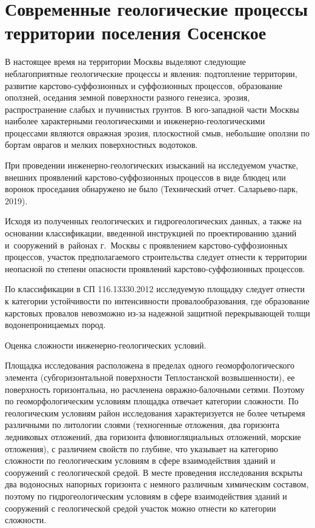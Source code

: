 \chapter{Современные геологические процессы территории поселения Сосенское}\label{ch:ch5}

В настоящее время на территории Москвы выделяют следующие неблагоприятные геологические процессы и явления: 
подтопление территории, развитие карстово-суффозионных и суффозионных процессов, образование оползней, 
оседания земной поверхности разного генезиса, эрозия, распространение слабых и пучинистых грунтов. 
В юго-западной части Москвы наиболее характерными геологическими и инженерно-геологическими процессами 
являются овражная эрозия, плоскостной смыв, небольшие оползни по бортам оврагов и мелких поверхностных водотоков.

При проведении инженерно-геологических изысканий на исследуемом участке, внешних проявлений карстово-суффозионных 
процессов в виде блюдец или воронок проседания обнаружено 
не было (Технический отчет. Саларьево-парк, 2019).

Исходя из полученных геологических и гидрогеологических данных, а также на основании классификации, 
введенной инструкцией по проектированию зданий и~сооружений в~районах г.~Москвы с проявлением 
карстово-суффозионных процессов, участок предполагаемого строительства следует отнести к территории 
неопасной по степени опасности проявлений карстово-суффозионных процессов.

По классификации в СП 116.13330.2012 исследуемую площадку следует отнести
 к  категории устойчивости 
по интенсивности провалообразования, где образование карстовых провалов невозможно 
из-за надежной защитной перекрывающей толщи водонепроницаемых пород.

Оценка сложности инженерно-геологических условий. 

Площадка исследования расположена в пределах одного 
геоморфологического элемента (субгоризонтальной поверхности 
Теплостанской возвышенности), ее поверхность 
горизонтальна, но расчленена овражно-балочными сетями. 
Поэтому по геоморфологическим условиям площадка отвечает 
 категории сложности. 
По геологическим условиям район исследования характеризуется 
не более четыремя различными по литологии слоями (техногенные отложения, 
два горизонта ледниковых отложений,
два горизонта флювиогляциальных отложений, морские отложения), 
с различием свойств по глубине, что указывает на  
категорию сложности по геологическим условиям в сфере взаимодействия 
зданий и сооружений с геологической средой. 
В месте проведения исследования вскрыты два водоносных напорных горизонта с немного 
различным химическим составом, поэтому по гидрогеологическим 
условиям  в сфере взаимодействия зданий и сооружений с геологической 
средой участок можно отнести ко  категории сложности. 

